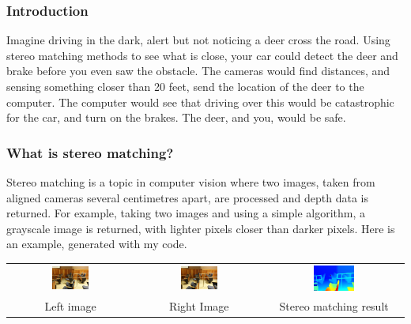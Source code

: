 \documentclass[19pt]{beamer}
\begin{document}

\begin{frame}
\frametitle{Introduction}

Imagine driving in the dark, alert but not noticing a deer cross the road. Using stereo matching methods to see what is close, your car could detect the deer and brake before you even saw the obstacle. The cameras would find distances, and sensing something closer than 20 feet, send the location of the deer to the computer. The computer would see that driving over this would be catastrophic for the car, and turn on the brakes. The deer, and you, would be safe.
\end{frame}


\begin{frame}
\frametitle{What is stereo matching?}

Stereo matching is a topic in computer vision where two images, taken from aligned cameras several centimetres apart, are processed and depth data is returned. For example, taking two images and using a simple algorithm, a grayscale image is returned, with lighter pixels closer than darker pixels. Here is an example, generated with my code.\\[20pt]

\centering
\setlength{}
\begin{tabular}{ccc}
\includegraphics[width=0.31\textwidth]{images/im0-600.jpg} &
\includegraphics[width=0.31\textwidth]{images/im1-600.jpg} &
\includegraphics[width=0.31\textwidth]{images/disp-600.jpg} \\[2pt]
Left image & Right Image & Stereo matching result \\
\end{tabular}

\end{frame}
\end{document}
